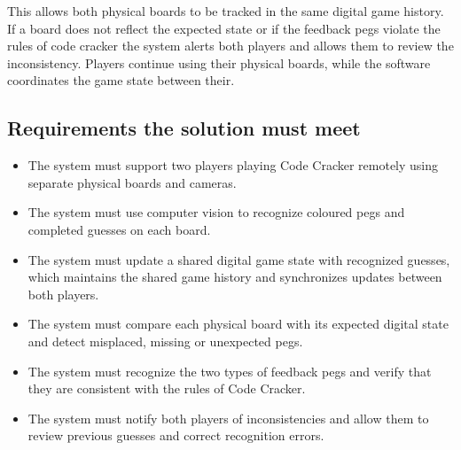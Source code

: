 \documentclass[11pt, a4paper]{article}
\begin{document}
This allows both physical boards to be tracked in the same digital game history. 
If a board does not reflect the expected state or if the feedback pegs violate the rules of code cracker the system alerts both players and allows them to review the inconsistency. 
Players continue using their physical boards, while the software coordinates the game state between their.

\subsection{Requirements the solution must meet}
\begin{itemize}
    \item The system must support two players playing Code Cracker remotely using separate physical boards and cameras.
    \item The system must use computer vision to recognize coloured pegs and completed guesses on each board.
    \item The system must update a shared digital game state with recognized guesses, which maintains the shared game history and synchronizes updates between both players.
    \item The system must compare each physical board with its expected digital state and detect misplaced, missing or unexpected pegs.
    \item The system must recognize the two types of feedback pegs and verify that they are consistent with the rules of Code Cracker.
    \item The system must notify both players of inconsistencies and allow them to review previous guesses and correct recognition errors.
\end{itemize}
\end{document}
